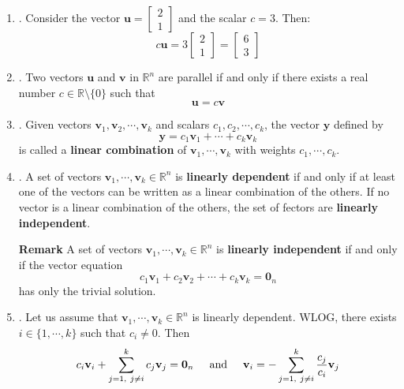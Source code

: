 \documentclass[12pt]{article}
\begin{document}
\begin{enumerate}
\begin{enumerate}
	\item\underline{}.
		Consider the vector $\mathbf{u}=\begin{bmatrix}2 \\ 1\end{bmatrix}$ and the scalar $c=3$. Then:
			\[c\mathbf{u}=3\begin{bmatrix}2 \\ 1 \end{bmatrix}=\begin{bmatrix}6\\3\end{bmatrix}\]
	
	\item\underline{}.
	Two vectors $\mathbf{u}$ and $\mathbf{v}$ in $\mathbb{R}^n$ are parallel if and only if there exists a real number $c \in \mathbb{R}\setminus \{0\}$ such that 
		\[ \mathbf{u} = c \mathbf{v} \]

	\item\underline{}.
		Given vectors $\mathbf{{v}}_1,\mathbf{{v}}_2,\cdots,\mathbf{{v}}_k$ and scalars $c_1,c_2,\cdots,c_k$, the vector $\mathbf{{y}}$ defined by
			\[ \mathbf{{y}}=c_1\mathbf{{v}}_1+\cdots+c_k\mathbf{{v}}_k \]
		is called a \textbf{linear combination} of $\mathbf{{v}}_1,\cdots,\mathbf{{v}}_k$ with weights $c_1,\cdots,c_k$.

	\item\underline{}. %
		A set of vectors $\mathbf{{v}}_1,\cdots,\mathbf{{v}}_k \in \mathbb{R}^n$ is \textbf{linearly dependent} if and only if at least one of the vectors can be written as a linear combination of the others. If no vector is a linear combination of the others, the set of fectors are \textbf{linearly independent}.

		\textbf{Remark} A set of vectors $\mathbf{{v}}_1,\cdots,\mathbf{{v}}_k \in \mathbb{R}^n$ is \textbf{linearly independent} if and only if the vector equation 
		\[ c_1 \mathbf{{v}}_1 + c_2 \mathbf{{v}}_2 + \cdots + c_k \mathbf{{v}}_k = \mathbf{0}_n \]
		has only the trivial solution. 
		
	\item\underline{}. Let us assume that $\mathbf{{v}}_1,\cdots,\mathbf{{v}}_k \in \mathbb{R}^n$ is linearly dependent. WLOG, there exists $i \in \{1, \cdots, k\}$ such that $c_i \neq 0$. Then 
		\begin{align*}
			c_i \mathbf{v}_i + \sum_{j=1, \ j \neq i}^k c_j \mathbf{v}_j = \mathbf{0}_n  \hspace{5mm} \mbox{and} \hspace{5mm}	\mathbf{v}_i = - \sum_{j=1, \ j \neq i}^k \frac{c_j}{c_i} \mathbf{v}_j
		\end{align*}
		

\end{enumerate}
\end{enumerate}
\end{document}
